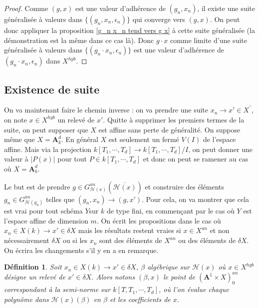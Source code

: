 \documentclass[11pt]{article}
\newcommand{\h}{\mathcal{H}}
\newcommand{\ana}{\mathbf{A}}
\newtheorem{defi}[thm]{Définition}
\begin{document}
\begin{proof}
Comme $(g,x)$ est une valeur d'adhérence de $(g_n, x_n)$, il existe une suite généralisée à valeurs dans $\lbrace (g_n, x_n, \epsilon_n) \rbrace$ qui converge vers $(g,x)$. On peut donc appliquer la proposition \ref{g_n x_n tend vers g x} à cette suite généralisée (la démonstration est la même dans ce cas là). Donc $g\cdot x$ comme limite d'une suite généralisée à valeurs dans $\lbrace (g_n\cdot x_n, \epsilon_n)\rbrace$ est une valeur d'adhérence de $(g_n\cdot x_n, \epsilon_n)$ dans $X^{hyb}$.
\end{proof}

\subsection{Existence de suite}

On va maintenant faire le chemin inverse : on va prendre une suite $x_n \rightarrow x' \in X^\urcorner$, on note $x \in X^{hyb}$ un relevé de $x'$. Quitte à supprimer les premiers termes de la suite, on peut supposer que $X$ est affine sans perte de généralité. On suppose même que $X = \ana^d_k$. En général $X$ est seulement un fermé $V(I)$ de l'espace affine. Mais via la projection $k[T_1, \cdots, T_d] \rightarrow k[T_1, \cdots, T_d]/I$, on peut donner une valeur à $|P(x)|$ pour tout $P \in k[T_1, \cdots, T_d]$ et donc on peut se ramener au cas où $X = \ana^d_k$.

Le but est de prendre $g \in G^{an}_{\h(x)}(\overline{\mathcal{H}(x)})$ et construire des éléments $g_n \in G^{an}_{\h(g_n)}$ telles que $(g_n, x_n) \rightarrow (g,x')$. Pour cela, on va montrer que cela est vrai pour tout schéma $Y$sur $k$ de type fini, en commençant par le cas où $Y$ est l'espace affine de dimension $m$. On écrit les propositions dans le cas où $x_n \in X(k) \rightarrow x'\in \delta X$ mais les résultats restent vraies si $x \in X^{an}$ et non nécessairement $\delta X$ ou si les $x_n$ sont des éléments de $X^{an}$ ou des éléments de $\delta X$. On écrira les changements s'il y en a en remarque.

\begin{defi}\label{def beta algebrique}
Soit $x_n \in X(k) \rightarrow x' \in \delta X, ~\beta$ algébrique sur $\mathcal{H}(x)$ où $x \in X^{hyb}$ désigne un relevé de $x'\in \delta X$. Alors notons
 $(\beta, x)$ le point de $(\ana^1 \times X)^{an}_0$ correspondant à la semi-norme sur $k[T, T_1, \cdots, T_d]$, où l'on évalue chaque polynôme dans $\mathcal{H}(x)(\beta)$ en 
  $\beta$ et les coefficients de $x$.
\end{defi}
\end{document}
